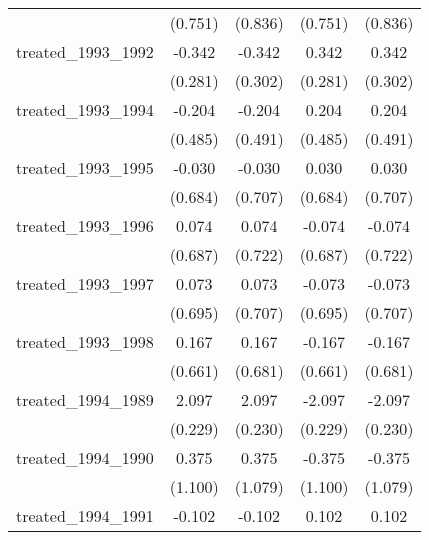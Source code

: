 {\begin{tabular}{l*{4}{c}}
            &     (0.751)         &     (0.836)         &     (0.751)         &     (0.836)         \\
[1em]
treated\_1993\_1992&      -0.342         &      -0.342         &       0.342         &       0.342         \\
            &     (0.281)         &     (0.302)         &     (0.281)         &     (0.302)         \\
[1em]
treated\_1993\_1994&      -0.204         &      -0.204         &       0.204         &       0.204         \\
            &     (0.485)         &     (0.491)         &     (0.485)         &     (0.491)         \\
[1em]
treated\_1993\_1995&      -0.030         &      -0.030         &       0.030         &       0.030         \\
            &     (0.684)         &     (0.707)         &     (0.684)         &     (0.707)         \\
[1em]
treated\_1993\_1996&       0.074         &       0.074         &      -0.074         &      -0.074         \\
            &     (0.687)         &     (0.722)         &     (0.687)         &     (0.722)         \\
[1em]
treated\_1993\_1997&       0.073         &       0.073         &      -0.073         &      -0.073         \\
            &     (0.695)         &     (0.707)         &     (0.695)         &     (0.707)         \\
[1em]
treated\_1993\_1998&       0.167         &       0.167         &      -0.167         &      -0.167         \\
            &     (0.661)         &     (0.681)         &     (0.661)         &     (0.681)         \\
[1em]
treated\_1994\_1989&       2.097\sym{***}&       2.097\sym{***}&      -2.097\sym{***}&      -2.097\sym{***}\\
            &     (0.229)         &     (0.230)         &     (0.229)         &     (0.230)         \\
[1em]
treated\_1994\_1990&       0.375         &       0.375         &      -0.375         &      -0.375         \\
            &     (1.100)         &     (1.079)         &     (1.100)         &     (1.079)         \\
[1em]
treated\_1994\_1991&      -0.102         &      -0.102         &       0.102         &       0.102         \\

\end{tabular}}

